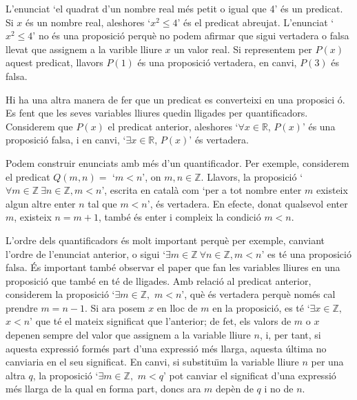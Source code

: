 \bigskip

L'enunciat `el quadrat d'un nombre real m\'{e}s petit o igual que 4' \'{e}s
un predicat. Si $x$ \'{e}s un nombre real, aleshores `$x^{2}\leq4$' \'{e}s
el predicat abreujat. L'enunciat `$x^{2}\leq4$' no \'{e}s una proposici\'{o}
perqu\`{e} no podem afirmar que sigui vertadera o falsa llevat que assignem
a la varible lliure $x$ un valor real. Si representem per $P(x)$ aquest
predicat, llavors $P(1)$ \'{e}s una proposici\'{o} vertadera, en canvi, $%
P(3) $ \'{e}s falsa.

Hi ha una altra manera de fer que un predicat es converteixi en una proposici%
\'{o}. Es fent que les seves variables lliures quedin lligades per
quantificadors. Considerem que $P(x)$ el predicat anterior, aleshores `$%
\forall x\in\mathbb{R}$, $P(x)$' \'{e}s una proposici\'{o} falsa, i en
canvi, `$\exists x\in\mathbb{R}$, $P(x)$' \'{e}s vertadera.

\bigskip

Podem construir enunciats amb m\'{e}s d'un quantificador. Per exemple,
considerem el predicat $Q(m,n)=$ `$m<n$', on $m,n\in\mathbb{Z}$. Llavors, la
proposici\'{o} `$\forall m\in\mathbb{Z}~\exists n\in\mathbb{Z},m<n$',
escrita en catal\`{a} com `per a tot nombre enter $m$ existeix algun altre
enter $n$ tal que $m<n$', \'{e}s vertadera. En efecte, donat qualsevol enter
$m$, existeix $n=m+1$, tamb\'{e} \'{e}s enter i compleix la condici\'{o} $%
m<n $.

\bigskip

L'ordre dels quantificadors \'{e}s molt important perqu\`{e} per exemple,
canviant l'ordre de l'enunciat anterior, o sigui `$\exists m\in\mathbb{Z}%
~\forall n\in\mathbb{Z},m<n$' es t\'{e} una proposici\'{o} falsa. \'{E}s
important tamb\'{e} observar el paper que fan les variables lliures en una
proposici\'{o} que tamb\'{e} en t\'{e} de lligades. Amb relaci\'{o} al
predicat anterior, considerem la proposici\'{o} `$\exists m\in\mathbb{Z},$ $%
m<n$', qu\`{e} \'{e}s vertadera perqu\`{e} nom\'{e}s cal prendre $m=n-1$. Si
ara posem $x$ en lloc de $m$ en la proposici\'{o}, es t\'{e} `$\exists x\in%
\mathbb{Z},$ $x<n$' que t\'{e} el mateix significat que l'anterior; de fet,
els valors de $m$ o $x$ depenen sempre del valor que assignem a la variable
lliure $n$, i, per tant, si aquesta expressi\'{o} form\'{e}s part d'una
expressi\'{o} m\'{e}s llarga, aquesta \'{u}ltima no canviaria en el seu
significat. En canvi, si substitu\"{\i}m la variable lliure $n$ per una
altra $q$, la proposici\'{o} `$\exists m\in\mathbb{Z},$ $m<q$' pot canviar
el significat d'una expressi\'{o} m\'{e}s llarga de la qual en forma part,
doncs ara $m$ dep\`{e}n de $q$ i no de $n$.

